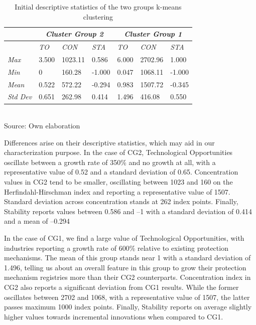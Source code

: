 \documentclass[12pt,a4paper]{article}
\begin{document}
\begin{table}[h!] 
	\caption{Initial descriptive statistics of the two groups k-means clustering}
	\centering
	\begin{tabular}{@{}lllllll@{}} 
		\toprule 
		\multicolumn{1}{c}{} & \multicolumn{3}{c}{\textit{Cluster Group 2}}                   & \multicolumn{3}{c}{\textit{Cluster   Group 1}} \\ \midrule 
		
		& \textit{TO} & \textit{CON} & \multicolumn{1}{l|}{\textit{STA}} & \textit{TO}   & \textit{CON}   & \textit{STA}  \\ \cmidrule(l){2-7}  
		
		\textit{Max}         & 3.500       & 1023.11      & \multicolumn{1}{l|}{0.586}        & 6.000         & 2702.96        & 1.000         \\ 
		
		\textit{Min}         & 0      & 160.28       & \multicolumn{1}{l|}{-1.000}       & 0.047        & 1068.11        & -1.000        \\ 
		
		\textit{Mean}        & 0.522      & 572.22       & \multicolumn{1}{l|}{-0.294}       & 0.983        & 1507.72        & -0.345        \\ 
		
		\textit{Std Dev}     & 0.651       & 262.98       & \multicolumn{1}{l|}{0.414}        & 1.496         & 416.08         & 0.550         \\ \bottomrule 
	\end{tabular} \\ 
 	Source: Own elaboration 
\end{table} 

Differences arise on their descriptive statistics, which may aid in our characterization purpose. In the case of CG2, Technological Opportunities oscillate between a growth rate of 350\% and no growth at all, with a representative value of 0.52 and a standard deviation of 0.65. Concentration values in CG2 tend to be smaller, oscillating between 1023 and 160 on the Herfindahl-Hirschman index and reporting a representative value of 1507. Standard deviation across concentration stands at 262 index points. Finally, Stability reports values between 0.586 and –1 with a standard deviation of 0.414 and a mean of –0.294 

In the case of CG1, we find a large value of Technological Opportunities, with industries reporting a growth rate of 600\% relative to existing protection mechanisms. The mean of this group stands near 1 with a standard deviation of 1.496, telling us about an overall feature in this group to grow their protection mechanism registries more than their CG2 counterparts. Concentration index in CG2 also reports a significant deviation from CG1 results. While the former oscillates between 2702 and 1068, with a representative value of 1507, the latter passes maximum 1000 index points. Finally, Stability reports on average slightly higher values towards incremental innovations when compared to CG1.  
\end{document}
